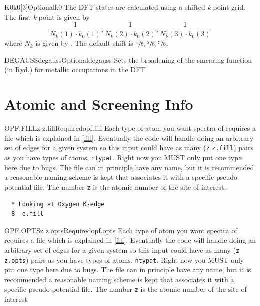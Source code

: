 \documentclass[11pt]{report}
\begin{document}
\begin{Card}{K0}{k0[3]}{Optional}{k0}
The DFT states are calculated using a shifted {\it k}-point grid. 
The first {\it k}-point is given by 
\begin{equation}
\frac{1}{N_k(1) \cdot k_0(1)}, \frac{1}{N_k(2) \cdot k_0(2)}, \frac{1}{N_k(3) \cdot k_0(3)} \nonumber
\end{equation}
where $N_k$ is given by .
The default shift is $\sfrac{1}{8},\sfrac{2}{8},\sfrac{3}{8}$.


\begin{Card}{DEGAUSS}{degauss}{Optional}{degauss}
Sets the broadening of the smearing function (in Ryd.) for metallic occupations in the DFT
\end{Card}

\section{Atomic and Screening Info}
\label{sec:AS-Info}

\begin{Card}{OPF.FILL}{z z.fill}{Required}{opf.fill}
Each type of atom you want spectra of requires a  file which is explained in \ref{fill}. Eventually the code will handle doing an arbitrary set of edges for a given system so this input could have as many (\texttt{z} \texttt{z.fill}) pairs as you have types of atoms, \texttt{ntypat}. Right now you MUST only put one type here due to bugs. The file  can in principle have any name, but it is recommended a reasonable naming scheme is kept that associates it with a specific pseudo-potential file. The number \texttt{z} is the atomic number of the site of interest.

\begin{verbatim}
  * Looking at Oxygen K-edge
  8  o.fill
\end{verbatim}
\end{Card}

\begin{Card}{OPF.OPTS}{z z.opts}{Required}{opf.opts}
Each type of atom you want spectra of requires a  file which is explained in \ref{fill}. Eventually the code will handle doing an arbitrary set of edges for a given system so this input could have as many (\texttt{z} \texttt{z.opts}) pairs as you have types of atoms, \texttt{ntypat}. Right now you MUST only put one type here due to bugs. The file  can in principle have any name, but it is recommended a reasonable naming scheme is kept that associates it with a specific pseudo-potential file. The number \texttt{z} is the atomic number of the site of interest.


\end{Card}
\end{Card}
\end{document}
